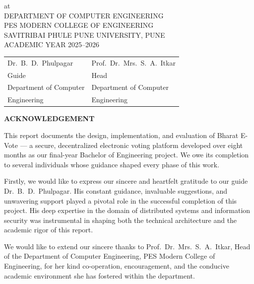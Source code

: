 \documentclass[oneside,a4paper,12pt]{book}
\begin{document}
\vspace*{0.5cm}
\begin{center}
at\\[0.3cm]
DEPARTMENT OF COMPUTER ENGINEERING\\[0.2cm]
PES MODERN COLLEGE OF ENGINEERING\\[0.2cm]
SAVITRIBAI PHULE PUNE UNIVERSITY, PUNE\\[0.2cm]
ACADEMIC YEAR 2025--2026
\end{center}

\vspace*{5\baselineskip}

\begin{tabular}{p{7cm} p{7cm}}
\centering Dr.\ B.\ D.\ Phulpagar & \centering Prof.\ Dr.\ Mrs.\ S.\ A.\ Itkar \tabularnewline
\centering Guide & \centering Head \tabularnewline
\centering Department of Computer & \centering Department of Computer \tabularnewline
\centering Engineering & \centering Engineering \tabularnewline
\end{tabular}

\clearpage

\begin{center}
{\bfseries \fontsize{16}{18}\selectfont ACKNOWLEDGEMENT}
\end{center}
\vspace{0.5cm}
\thispagestyle{empty}

This report documents the design, implementation, and evaluation of Bharat E-Vote --- a secure, decentralized electronic voting platform developed over eight months as our final-year Bachelor of Engineering project. We owe its completion to several individuals whose guidance shaped every phase of this work.

\vspace{0.5cm}
Firstly, we would like to express our sincere and heartfelt gratitude to our guide Dr.\ B.\ D.\ Phulpagar. His constant guidance, invaluable suggestions, and unwavering support played a pivotal role in the successful completion of this project. His deep expertise in the domain of distributed systems and information security was instrumental in shaping both the technical architecture and the academic rigor of this report.

\vspace{0.3cm}
We would like to extend our sincere thanks to Prof.\ Dr.\ Mrs.\ S.\ A.\ Itkar, Head of the Department of Computer Engineering, PES Modern College of Engineering, for her kind co-operation, encouragement, and the conducive academic environment she has fostered within the department.
\end{document}
